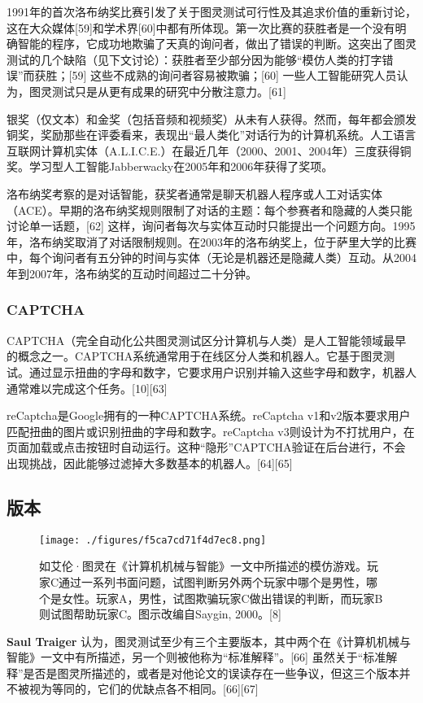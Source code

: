1991年的首次洛布纳奖比赛引发了关于图灵测试可行性及其追求价值的重新讨论，这在大众媒体[59]和学术界[60]中都有所体现。第一次比赛的获胜者是一个没有明确智能的程序，它成功地欺骗了天真的询问者，做出了错误的判断。这突出了图灵测试的几个缺陷（见下文讨论）：获胜者至少部分因为能够“模仿人类的打字错误”而获胜；[59] 这些不成熟的询问者容易被欺骗；[60] 一些人工智能研究人员认为，图灵测试只是从更有成果的研究中分散注意力。[61]

银奖（仅文本）和金奖（包括音频和视频奖）从未有人获得。然而，每年都会颁发铜奖，奖励那些在评委看来，表现出“最人类化”对话行为的计算机系统。人工语言互联网计算机实体（A.L.I.C.E.）在最近几年（2000、2001、2004年）三度获得铜奖。学习型人工智能Jabberwacky在2005年和2006年获得了奖项。

洛布纳奖考察的是对话智能，获奖者通常是聊天机器人程序或人工对话实体（ACE）。早期的洛布纳奖规则限制了对话的主题：每个参赛者和隐藏的人类只能讨论单一话题，[62] 这样，询问者每次与实体互动时只能提出一个问题方向。1995年，洛布纳奖取消了对话限制规则。在2003年的洛布纳奖上，位于萨里大学的比赛中，每个询问者有五分钟的时间与实体（无论是机器还是隐藏人类）互动。从2004年到2007年，洛布纳奖的互动时间超过二十分钟。
\subsubsection{CAPTCHA} 
CAPTCHA（完全自动化公共图灵测试区分计算机与人类）是人工智能领域最早的概念之一。CAPTCHA系统通常用于在线区分人类和机器人。它基于图灵测试。通过显示扭曲的字母和数字，它要求用户识别并输入这些字母和数字，机器人通常难以完成这个任务。[10][63]

reCaptcha是Google拥有的一种CAPTCHA系统。reCaptcha v1和v2版本要求用户匹配扭曲的图片或识别扭曲的字母和数字。reCaptcha v3则设计为不打扰用户，在页面加载或点击按钮时自动运行。这种“隐形”CAPTCHA验证在后台进行，不会出现挑战，因此能够过滤掉大多数基本的机器人。[64][65]
\subsection{版本}
\begin{figure}[ht]
\centering
\texttt{[image: ./figures/f5ca7cd71f4d7ec8.png]}
\caption{如艾伦·图灵在《计算机机械与智能》一文中所描述的模仿游戏。玩家C通过一系列书面问题，试图判断另外两个玩家中哪个是男性，哪个是女性。玩家A，男性，试图欺骗玩家C做出错误的判断，而玩家B则试图帮助玩家C。图示改编自Saygin, 2000。[8]} \label{fig_TLCS_2}
\end{figure}
\textbf{Saul Traiger} 认为，图灵测试至少有三个主要版本，其中两个在《计算机机械与智能》一文中有所描述，另一个则被他称为“标准解释”。[66] 虽然关于“标准解释”是否是图灵所描述的，或者是对他论文的误读存在一些争议，但这三个版本并不被视为等同的，它们的优缺点各不相同。[66][67]

